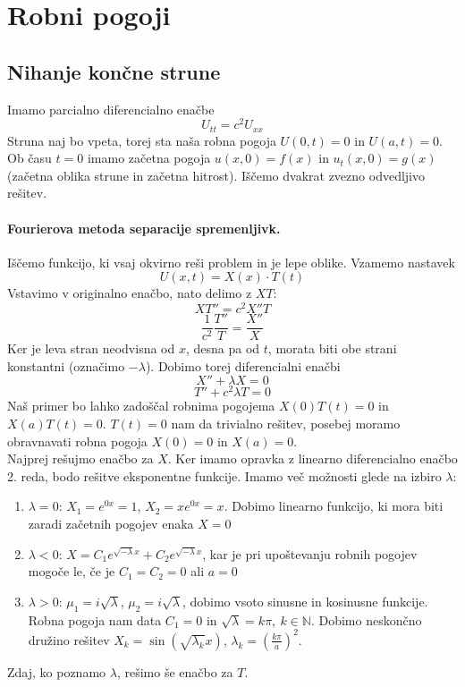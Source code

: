 \documentclass[a4paper]{article}
\newcommand{\N}{\mathbb{N}}
\begin{document}
\section{Robni pogoji}
\subsection{Nihanje končne strune}
Imamo parcialno diferencialno enačbe $$U_{tt} = c^2 U_{xx}$$
Struna naj bo vpeta, torej sta naša robna pogoja $U(0, t) = 0$ in $U(a, t) = 0$.
Ob času $t=0$ imamo začetna pogoja $u(x, 0) = f(x)$ in $u_t(x, 0) = g(x)$
(začetna oblika strune in začetna hitrost). Iščemo dvakrat zvezno odvedljivo rešitev.
\paragraph{Fourierova metoda separacije spremenljivk.} Iščemo funkcijo, ki vsaj okvirno reši problem in je lepe oblike.
Vzamemo nastavek $$U(x, t) = X(x) \cdot T(t)$$
Vstavimo v originalno enačbo, nato delimo z $XT$:
$$XT'' = c^2X''T$$
$$\frac{1}{c^2}\frac{T''}{T} = \frac{X''}{X}$$
Ker je leva stran neodvisna od $x$, desna pa od $t$, morata biti obe strani konstantni (označimo $-\lambda$). Dobimo torej diferencialni enačbi
$$X'' + \lambda X = 0$$
$$T'' + c^2 \lambda T = 0$$
Naš primer bo lahko zadoščal robnima pogojema $X(0)T(t) = 0$ in $X(a)T(t) = 0$.
$T(t)=0$ nam da trivialno rešitev, posebej moramo obravnavati robna pogoja $X(0) = 0$ in $X(a) = 0$. \\
Najprej rešujmo enačbo za $X$. Ker imamo opravka z linearno diferencialno enačbo 2. reda, bodo rešitve eksponentne funkcije. Imamo več možnosti glede na izbiro $\lambda$:
\begin{enumerate}
    \item $\lambda = 0$: $X_1 = e^{0x} = 1$, $X_2 = xe^{0x} = x$. Dobimo linearno funkcijo, ki mora biti zaradi začetnih pogojev enaka $X = 0$
    \item $\lambda < 0$: $X = C_1 e^{\sqrt{-\lambda} x} + C_2 e^{\sqrt{-\lambda} x}$, kar je pri upoštevanju robnih pogojev mogoče le, če je $C_1 = C_2 = 0$ ali $a=0$
    \item $\lambda > 0$: $\mu_1 = i\sqrt{\lambda}$, $\mu_2 = i\sqrt{\lambda}$, dobimo vsoto sinusne in kosinusne funkcije. Robna pogoja nam data
    $C_1 = 0$ in $\sqrt{\lambda} = k\pi,~k\in\N$. Dobimo neskončno družino rešitev $X_k = \sin (\sqrt{\lambda_k}x)$, $\displaystyle{\lambda_k = \left(\frac{k\pi}{a}\right)^2}$.
\end{enumerate}
Zdaj, ko poznamo $\lambda$, rešimo še enačbo za $T$.
\end{document}
